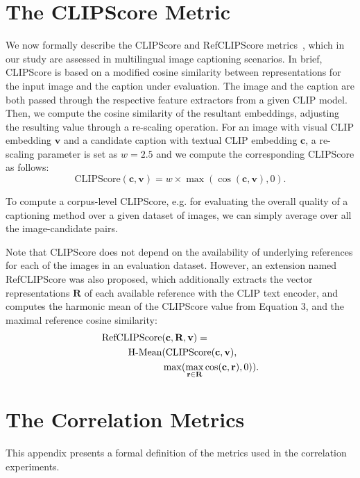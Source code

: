 \section{The CLIPScore Metric} \label{app:clipscore}

We now formally describe the CLIPScore and RefCLIPScore metrics~\cite{hessel2021clipscore}, which in our study are assessed in multilingual image captioning scenarios. In brief, CLIPScore is based on a modified cosine similarity between representations for the input image and the caption under evaluation. The image and the caption are both passed through the respective feature extractors from a given CLIP model. Then, we compute the cosine similarity of the resultant embeddings, adjusting the resulting value through a re-scaling operation. For an image with visual CLIP embedding $\textbf{v}$ and a candidate caption with textual CLIP embedding $\textbf{c}$, a re-scaling parameter is set as $w = 2.5$ and we compute the corresponding CLIPScore as follows:
\begin{equation}
\text{CLIPScore}({\textbf{c}}, {\textbf{v}}) =  w \times \max(\cos({\textbf{c}}, {\textbf{v}}), 0).
\end{equation}

To compute a corpus-level CLIPScore, e.g. for evaluating the overall quality of a captioning method over a given dataset of images, we can simply average over all the image-candidate pairs. 

Note that CLIPScore does not depend on the availability of underlying references for each of the images in an evaluation dataset. However, an extension named RefCLIPScore was also proposed, which additionally extracts the vector representations $\textbf{R}$ of each available reference with the CLIP text encoder, and computes the harmonic mean of the CLIPScore value from Equation 3, and the maximal reference cosine similarity:
\begin{align}
\text{RefCLIPScore}&({\textbf{c}}, {\textbf{R}}, {\textbf{v}}) = \notag \\
\text{H-Mean}&( \text{CLIPScore}({\textbf{c}}, {\textbf{v}}), \\
            &\max(\max_{{\textbf{r}} \in {\textbf{R}}} \cos({\textbf{c}}, {\textbf{r}}), 0)).\notag
\end{align}

\section{The Correlation Metrics} \label{app:metrics}
This appendix presents a formal definition of the metrics used in the correlation experiments.

